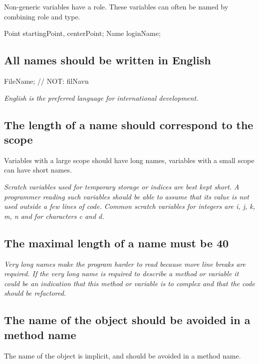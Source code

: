 \documentclass[a4paper,11pt,oneside]{scrbook}
\newcommand{\guideline}[1]{{\subsection{#1}}}
\newcommand{\motivation}[1]{{\normalfont \itshape #1}}
\begin{document}
Non-generic variables have a role. These variables can often be named by
combining role and type.

\begin{code}
  Point startingPoint, centerPoint;
  Name loginName;
\end{code}

\guideline{All names should be written in English}

\begin{code}
  FileName;     // NOT: filNavn 
\end{code}

\motivation{
  English is the preferred language for international development.
}

\guideline{The length of a name should correspond to the scope}

Variables with a large scope should have long names, variables with a small
scope can have short names.

\motivation{ 
  Scratch variables used for temporary storage or indices are best kept short. A
  programmer reading such variables should be able to assume that its value is
  not used outside a few lines of code. Common scratch variables for integers
  are i, j, k, m, n and for characters c and d.
}

\guideline{The maximal length of a name must be 40}

\motivation{ 
  Very long names make the program harder to read because more line breaks are
  required. If the very long name is required to describe a method or variable
  it could be an indication that this method or variable is to complex and that
  the code should be refactored.
}

\guideline{The name of the object should be avoided in a method name}

The name of the object is implicit, and should be avoided in a method name. 
\end{document}
